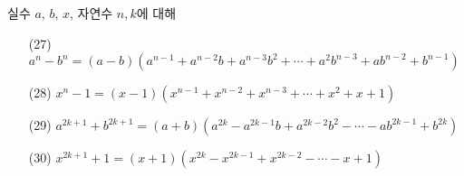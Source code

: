 \documentclass{article}
\begin{document}
실수 \(a\), \(b\), \(x\), 자연수 \(n, k\)에 대해
\begin{enumerate}
\item[(27)]
\(a^n-b^n=(a-b)(a^{n-1}+a^{n-2}b+a^{n-3}b^2+\cdots +a^2b^{n-3}+ab^{n-2}+b^{n-1})\)
\item[(28)]
\(x^n-1=(x-1)(x^{n-1}+x^{n-2}+x^{n-3}+\cdots+x^2+x+1)\)
\item[(29)]
\(a^{2k+1}+b^{2k+1}=(a+b)(a^{2k}-a^{2k-1}b+a^{2k-2}b^2-\cdots-ab^{2k-1}+b^{2k})\)
\item[(30)]
\(x^{2k+1}+1=(x+1)(x^{2k}-x^{2k-1}+x^{2k-2}-\cdots-x+1)\)
\end{enumerate}
\end{document}
